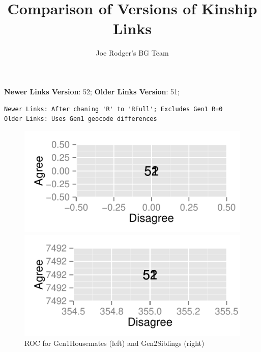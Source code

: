 \documentclass[a4paper]{article}\usepackage{graphicx, color}
\title{Comparison of Versions of Kinship Links}
\author{Joe Rodger's BG Team}
\makeatletter
\def\maxwidth{ %
  \ifdim\Gin@nat@width>\linewidth
    \linewidth
  \else
    \Gin@nat@width
  \fi
}
\newenvironment{kframe}{%
 \def\at@end@of@kframe{}%
 \ifinner\ifhmode%
  \def\at@end@of@kframe{\end{minipage}}%
  \begin{minipage}{\columnwidth}%
 \fi\fi%
 \def\FrameCommand##1{\hskip\@totalleftmargin \hskip-\fboxsep
 \colorbox{shadecolor}{##1}\hskip-\fboxsep
     \hskip-\linewidth \hskip-\@totalleftmargin \hskip\columnwidth}%
 \MakeFramed {\advance\hsize-\width
   \@totalleftmargin\z@ \linewidth\hsize
   \@setminipage}}%
 {\par\unskip\endMakeFramed%
 \at@end@of@kframe}
\newenvironment{knitrout}{}{} %
\makeatother
\begin{document}
\maketitle

\setlength{\parindent}{0pt}%







\textbf{Newer Links Version}: 52;
\textbf{Older Links Version}: 51;

\begin{knitrout}
\color{fgcolor}\begin{kframe}
\begin{verbatim}
Newer Links: After chaning 'R' to 'RFull'; Excludes Gen1 R=0
Older Links: Uses Gen1 geocode differences
\end{verbatim}
\end{kframe}
\end{knitrout}


\begin{figure}[htbp]
\begin{knitrout}
\color{fgcolor}
\includegraphics[width=\maxwidth]{figure/unnamed-chunk-31} 

\includegraphics[width=\maxwidth]{figure/unnamed-chunk-32} 

\end{knitrout}

\caption{ROC for Gen1Housemates (left) and Gen2Siblings (right)}
\end{figure}
\end{document}

